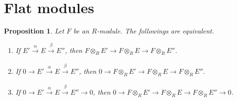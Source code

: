\documentclass[12pt]{report}
\theoremstyle{plain}
\newtheorem{proposition}[theorem]{Proposition}
\theoremstyle{remark}
\theoremstyle{definition}
\begin{document}
\section{Flat modules}
\begin{proposition}\label{prop:def_flat_modules}
    Let $F$ be an $R$-module. The followings are equivalent.
    \begin{enumerate}[label=F\arabic*.]
        \item If $E'\xrightarrow[]{\alpha} E\xrightarrow[]{\beta} E''$, then $F\otimes_R E' \to F\otimes_R E \to F\otimes_R E''$.
        \item If $0\to E'\xrightarrow[]{\alpha} E\xrightarrow[]{\beta} E''$, then $0\to F\otimes_R E' \to F\otimes_R E \to F\otimes_R E''$.
        \item If $0\to E'\xrightarrow[]{\alpha} E\xrightarrow[]{\beta} E''\to 0$, then $0\to F\otimes_R E' \to F\otimes_R E \to F\otimes_R E''\to 0$.
    \end{enumerate}
\end{proposition}
\end{document}
